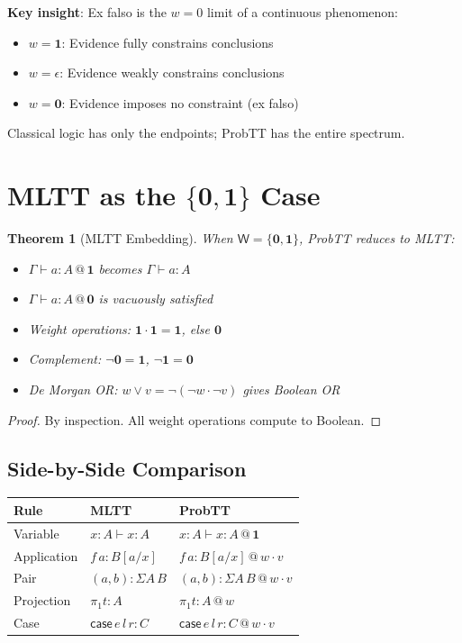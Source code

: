 \documentclass[11pt,a4paper]{article}
\makeatletter
\newtheorem{theorem}{Theorem}[section]
\newcommand{\W}{\mathsf{W}}
\newcommand{\at}[1]{\,@\,#1}
\newcommand{\one}{\mathbf{1}}
\newcommand{\zero}{\mathbf{0}}
\newcommand{\negw}{\neg}
\makeatother
\begin{document}
\textbf{Key insight}: Ex falso is the $w = 0$ limit of a continuous phenomenon:
\begin{itemize}
    \item $w = \one$: Evidence fully constrains conclusions
    \item $w = \epsilon$: Evidence weakly constrains conclusions
    \item $w = \zero$: Evidence imposes no constraint (ex falso)
\end{itemize}

Classical logic has only the endpoints; ProbTT has the entire spectrum.

\section{MLTT as the $\{\zero, \one\}$ Case}

\begin{theorem}[MLTT Embedding]
When $\W = \{\zero, \one\}$, ProbTT reduces to MLTT:
\begin{itemize}
    \item $\Gamma \vdash a : A \at{\one}$ becomes $\Gamma \vdash a : A$
    \item $\Gamma \vdash a : A \at{\zero}$ is vacuously satisfied
    \item Weight operations: $\one \cdot \one = \one$, else $\zero$
    \item Complement: $\negw\zero = \one$, $\negw\one = \zero$
    \item De Morgan OR: $w \vee v = \negw(\negw w \cdot \negw v)$ gives Boolean OR
\end{itemize}
\end{theorem}

\begin{proof}
By inspection. All weight operations compute to Boolean.
\end{proof}

\subsection{Side-by-Side Comparison}

\begin{center}
\begin{tabular}{l|l|l}
\textbf{Rule} & \textbf{MLTT} & \textbf{ProbTT} \\
\hline
Variable & $x : A \vdash x : A$ & $x : A \vdash x : A \at{\one}$ \\
Application & $f\,a : B[a/x]$ & $f\,a : B[a/x] \at{w \cdot v}$ \\
Pair & $(a, b) : \Sigma A\,B$ & $(a, b) : \Sigma A\,B \at{w \cdot v}$ \\
Projection & $\pi_1 t : A$ & $\pi_1 t : A \at{w}$ \\
Case & $\mathsf{case}\,e\,l\,r : C$ & $\mathsf{case}\,e\,l\,r : C \at{w \cdot v}$ \\
\end{tabular}
\end{center}
\end{document}
